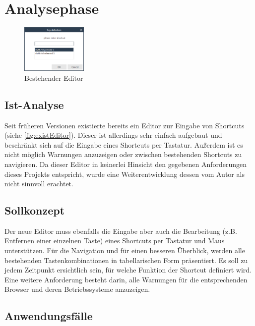 \section{Analysephase}

\begin{figure}
	\vspace{-12px}
	\centering
	\includegraphics[width=120px]{../graphic/images/screenshots/Alter-Editor}
	\caption{Bestehender Editor}
	\label{fig:existEditor}
\end{figure}

\subsection{Ist-Analyse}

Seit früheren Versionen existierte bereits ein Editor zur Eingabe von Shortcuts (siehe \autoref{fig:existEditor}). Dieser ist allerdings sehr einfach aufgebaut und beschränkt sich auf die Eingabe eines Shortcuts per Tastatur. Außerdem ist es nicht möglich Warnungen anzuzeigen oder zwischen bestehenden Shortcuts zu navigieren. Da dieser Editor in keinerlei Hinsicht den gegebenen Anforderungen dieses Projekts entspricht, wurde eine Weiterentwicklung dessen vom Autor als nicht sinnvoll erachtet.

\subsection{Sollkonzept}

Der neue Editor muss ebenfalls die Eingabe aber auch die Bearbeitung (z.B. Entfernen einer einzelnen Taste) eines Shortcuts per Tastatur und Maus unterstützen. Für die Navigation und für einen besseren Überblick, werden alle bestehenden Tastenkombinationen in tabellarischen Form präsentiert. Es soll zu jedem Zeitpunkt ersichtlich sein, für welche Funktion der Shortcut definiert wird. Eine weitere Anforderung besteht darin, alle Warnungen für die entsprechenden Browser und deren Betriebssysteme anzuzeigen.

\subsection{Anwendungsfälle}

